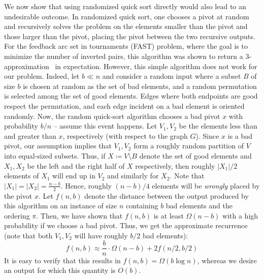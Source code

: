 \documentclass[11pt]{llncs}
\begin{document}
We now show that using randomized quick sort directly would also lead to an undesirable outcome. In randomized quick sort, one chooses a pivot at random and recursively solves the problem on the elements smaller than the pivot and those larger than the pivot, placing the pivot between the two recursive outputs. For the feedback arc set in tournaments (FAST) problem, where the goal is to minimize the number of inverted pairs, this algorithm was shown to return a $3$-approximation~\cite{acn08} in expectation. However, this simple algorithm does not work for our problem. Indeed, let $b \ll n$ and consider a random input where a subset $B$ of size $b$ is chosen at random as the set of bad elements, and a random permutation is selected among the set of good elements. Edges where both endpoints are good respect the permutation, and each edge incident on a bad element is oriented randomly. Now, the random quick-sort algorithm chooses a bad pivot $x$ with probability $b/n$ -- assume this event happens. Let $V_1, V_2$ be the elements less than and greater than $x$, respectively (with respect to the graph $G$). Since $x$ is a bad pivot, our assumption implies that $V_1, V_2$ form a roughly random partition of $V$ into equal-sized subsets. Thus, if $X \coloneqq V \setminus B$ denote the set of good elements and $X_1, X_2$ be the left and the right half of $X$ respectively, then roughly $|X_1|/2$ elements of $X_1$ will end up in $V_2$ and similarly for $X_2$. Note that $|X_1| = |X_2| = \frac{n-b}{2}$. Hence, roughly $(n-b)/4$ elements will be {\em wrongly} placed by the pivot $x$. Let $f(n,b)$ denote the distance between the output produced by this algorithm on an instance of size $n$ containing $b$ bad elements and the ordering $\pi$. Then, we have shown that $f(n,b)$ is at least $\Omega(n-b)$ with a high probability if we choose a bad pivot. Thus, we get the approximate recurrence (note that both $V_1, V_2$ will have roughly $b/2$ bad elements): 
$$f(n,b) \approx \frac{b}{n} \cdot \Omega(n-b) + 2 f(n/2,b/2)$$
It is easy to verify that this results in $f(n,b) = \Omega(b \log n)$, whereas we desire an output for which this quantity is $O(b)$. 
\end{document}
